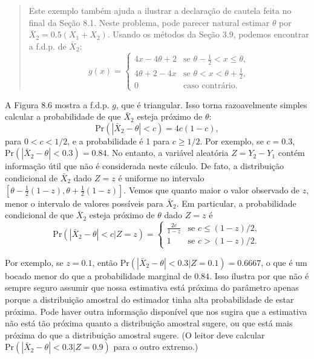 \begin{quote}
    Este exemplo também ajuda a ilustrar a declaração de cautela feita no final da Seção 8.1. Neste problema, pode parecer natural estimar $\theta$ por $\bar{X}_2 = 0.5(X_1 + X_2)$. Usando os métodos da Seção 3.9, podemos encontrar a f.d.p. de $\bar{X}_2$:
    \[
    g(x) = \begin{cases}
        4x - 4\theta + 2 & \text{se } \theta - \frac{1}{2} < x \le \theta, \\
        4\theta + 2 - 4x & \text{se } \theta < x < \theta + \frac{1}{2}, \\
        0 & \text{caso contrário}.
    \end{cases}
    \]
\end{quote}
\vspace{1em}

A Figura 8.6 mostra a f.d.p. $g$, que é triangular. Isso torna razoavelmente simples calcular a probabilidade de que $\bar{X}_2$ esteja próximo de $\theta$:
$$
\text{Pr}(|\bar{X}_2 - \theta| < c) = 4c(1-c),
$$
para $0 < c < 1/2$, e a probabilidade é 1 para $c \ge 1/2$. Por exemplo, se $c = 0.3$, $\text{Pr}(|\bar{X}_2 - \theta| < 0.3) = 0.84$. No entanto, a variável aleatória $Z = Y_2 - Y_1$ contém informação útil que não é considerada neste cálculo. De fato, a distribuição condicional de $\bar{X}_2$ dado $Z = z$ é uniforme no intervalo $[\theta - \frac{1}{2}(1-z), \theta + \frac{1}{2}(1-z)]$. Vemos que quanto maior o valor observado de $z$, menor o intervalo de valores possíveis para $\bar{X}_2$. Em particular, a probabilidade condicional de que $\bar{X}_2$ esteja próximo de $\theta$ dado $Z=z$ é
\begin{equation} \label{eq:8.5.15}
    \text{Pr}(|\bar{X}_2 - \theta| < c | Z = z) = 
    \begin{cases}
        \frac{2c}{1-z} & \text{se } c \le (1-z)/2, \\
        1 & \text{se } c > (1-z)/2.
    \end{cases}
\end{equation}

Por exemplo, se $z = 0.1$, então $\text{Pr}(|\bar{X}_2 - \theta| < 0.3 | Z = 0.1) = 0.6667$, o que é um bocado menor do que a probabilidade marginal de $0.84$. Isso ilustra por que não é sempre seguro assumir que nossa estimativa está próxima do parâmetro apenas porque a distribuição amostral do estimador tinha alta probabilidade de estar próxima. Pode haver outra informação disponível que nos sugira que a estimativa não está tão próxima quanto a distribuição amostral sugere, ou que está mais próxima do que a distribuição amostral sugere. (O leitor deve calcular $\text{Pr}(|\bar{X}_2 - \theta| < 0.3 | Z = 0.9)$ para o outro extremo.)

